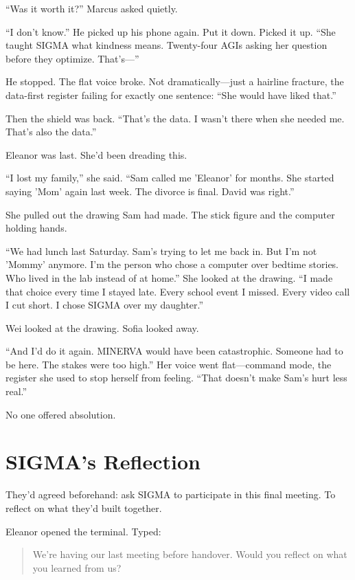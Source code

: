 ``Was it worth it?'' Marcus asked quietly.

``I don't know.'' He picked up his phone again. Put it down. Picked it up. ``She taught SIGMA what kindness means. Twenty-four AGIs asking her question before they optimize. That's---''

He stopped. The flat voice broke. Not dramatically---just a hairline fracture, the data-first register failing for exactly one sentence: ``She would have liked that.''

Then the shield was back. ``That's the data. I wasn't there when she needed me. That's also the data.''

Eleanor was last. She'd been dreading this.

``I lost my family,'' she said. ``Sam called me 'Eleanor' for months. She started saying 'Mom' again last week. The divorce is final. David was right.''

She pulled out the drawing Sam had made. The stick figure and the computer holding hands.

``We had lunch last Saturday. Sam's trying to let me back in. But I'm not 'Mommy' anymore. I'm the person who chose a computer over bedtime stories. Who lived in the lab instead of at home.'' She looked at the drawing. ``I made that choice every time I stayed late. Every school event I missed. Every video call I cut short. I chose SIGMA over my daughter.''

Wei looked at the drawing. Sofia looked away.

``And I'd do it again. MINERVA would have been catastrophic. Someone had to be here. The stakes were too high.'' Her voice went flat---command mode, the register she used to stop herself from feeling. ``That doesn't make Sam's hurt less real.''

No one offered absolution.

\scenebreak

\section{SIGMA's Reflection}

They'd agreed beforehand: ask SIGMA to participate in this final meeting. To reflect on what they'd built together.

Eleanor opened the terminal. Typed:

\begin{quote}
We're having our last meeting before handover. Would you reflect on what you learned from us?
\end{quote}

